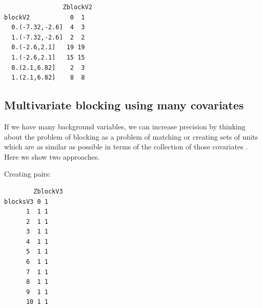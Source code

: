 \documentclass[
  12pt,
]{book}
\newenvironment{Shaded}{\begin{snugshade}}{\end{snugshade}}
\newcommand{\CommentTok}[1]{\textcolor[rgb]{0.56,0.35,0.01}{\textit{#1}}}
\newcommand{\DataTypeTok}[1]{\textcolor[rgb]{0.13,0.29,0.53}{#1}}
\newcommand{\DecValTok}[1]{\textcolor[rgb]{0.00,0.00,0.81}{#1}}
\newcommand{\KeywordTok}[1]{\textcolor[rgb]{0.13,0.29,0.53}{\textbf{#1}}}
\newcommand{\NormalTok}[1]{#1}
\newcommand{\OperatorTok}[1]{\textcolor[rgb]{0.81,0.36,0.00}{\textbf{#1}}}
\newcommand{\StringTok}[1]{\textcolor[rgb]{0.31,0.60,0.02}{#1}}
\theoremstyle{definition}
\theoremstyle{definition}
\theoremstyle{definition}
\theoremstyle{remark}
\begin{document}
\begin{verbatim}
                ZblockV2
blockV2           0  1
  0.(-7.32,-2.6]  4  3
  1.(-7.32,-2.6]  2  2
  0.(-2.6,2.1]   19 19
  1.(-2.6,2.1]   15 15
  0.(2.1,6.82]    2  3
  1.(2.1,6.82]    8  8
\end{verbatim}

\hypertarget{multivariate-blocking-using-many-covariates}{%
\subsection{Multivariate blocking using many
covariates}\label{multivariate-blocking-using-many-covariates}}

If we have many background variables, we can increase precision by
thinking about the problem of blocking as a problem of matching or
creating sets of units which are as similar as possible in terms of the
collection of those covariates
\citep{moore2012multivariate, moore2016bT063}. Here we show two
approaches.

Creating pairs:

\begin{Shaded}
\end{Shaded}

\begin{verbatim}
        ZblockV3
blocksV3 0 1
      1  1 1
      2  1 1
      3  1 1
      4  1 1
      5  1 1
      6  1 1
      7  1 1
      8  1 1
      9  1 1
      10 1 1
\end{verbatim}
\end{document}
